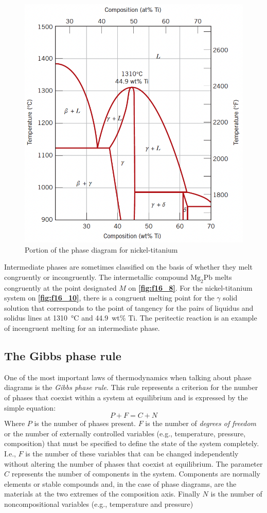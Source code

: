 \begin{figure} [ht]
  \centering
  \includegraphics[width=0.5\linewidth]{./figures/f16_10.png}
  \caption{Portion of the phase diagram for nickel-titanium}
  \label{fig:f16_10}
\end{figure}

Intermediate phases are sometimes classified on the basis of whether they melt congruently or incongruently. The intermetallic compound $\mathrm{Mg}_2 \mathrm{Pb}$ melts congruently at the point designated $M$ on \textbf{\autoref{fig:f16_8}}. For the nickel-titanium system on \textbf{\autoref{fig:f16_10}}, there is a congruent melting point for the $\gamma$ solid solution that corresponds to the point of tangency for the pairs of liquidus and solidus lines at \qty{1310}{\celsius} and \qty{44,9}{wt}\% Ti. The peritectic reaction is an example of incengruent melting for an intermediate phase. 

\subsection{The Gibbs phase rule}
One of the most important laws of thermodynamics when talking about phase diagrams is the \textit{Gibbs phase rule}. This rule represents a criterion for the number of phases that coexist within a system at equilibrium and is expressed by the simple equation:
\[ 
P + F = C + N
\]
Where $P$ is the number of phases present. $F$ is the number of \textit{degrees of freedom} or the number of externally controlled variables (e.g., temperature, pressure, composition) that must be specified to define the state of the system completely. I.e., $F$ is the number of these variables that can be changed independently without altering the number of phases that coexist at equilibrium. The parameter $C$ represents the number of components in the system. Components are normally elements or stable compounds and, in the case of phase diagrams, are the materials at the two extremes of the composition axis. Finally $N$ is the number of noncompositional variables (e.g., temperature and pressure)

